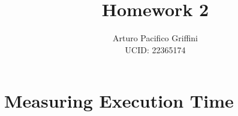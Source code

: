 \documentclass[11pt,letter]{article}
\title{Homework 2}
\author{Arturo Pacifico Griffini\\
  UCID: 22365174}
\date{}
\begin{document}
\maketitle
%

\pagebreak



\section{Measuring Execution Time}

%
%
%
%
%
%


\end{document}
